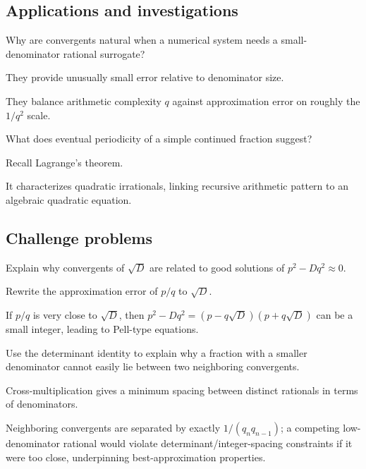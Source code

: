 \subsection*{Applications and investigations}

\begin{exercise}\label{exr:ii25-expand-13}
Why are convergents natural when a numerical system needs a small-denominator rational surrogate?
\end{exercise}
\begin{hint}
They provide unusually small error relative to denominator size.
\end{hint}
\begin{solution}
They balance arithmetic complexity \(q\) against approximation error on roughly the \(1/q^2\) scale.
\end{solution}

\begin{exercise}\label{exr:ii25-expand-14}
What does eventual periodicity of a simple continued fraction suggest?
\end{exercise}
\begin{hint}
Recall Lagrange's theorem.
\end{hint}
\begin{solution}
It characterizes quadratic irrationals, linking recursive arithmetic pattern to an algebraic quadratic equation.
\end{solution}

\subsection*{Challenge problems}

\begin{exercise}\label{exr:ii25-expand-15}
Explain why convergents of \(\sqrt D\) are related to good solutions of \(p^2-Dq^2\approx0\).
\end{exercise}
\begin{hint}
Rewrite the approximation error of \(p/q\) to \(\sqrt D\).
\end{hint}
\begin{solution}
If \(p/q\) is very close to \(\sqrt D\), then \(p^2-Dq^2=(p-q\sqrt D)(p+q\sqrt D)\) can be a small integer, leading to Pell-type equations.
\end{solution}

\begin{exercise}\label{exr:ii25-expand-16}
Use the determinant identity to explain why a fraction with a smaller denominator cannot easily lie between two neighboring convergents.
\end{exercise}
\begin{hint}
Cross-multiplication gives a minimum spacing between distinct rationals in terms of denominators.
\end{hint}
\begin{solution}
Neighboring convergents are separated by exactly \(1/(q_nq_{n-1})\); a competing low-denominator rational would violate determinant/integer-spacing constraints if it were too close, underpinning best-approximation properties.
\end{solution}
